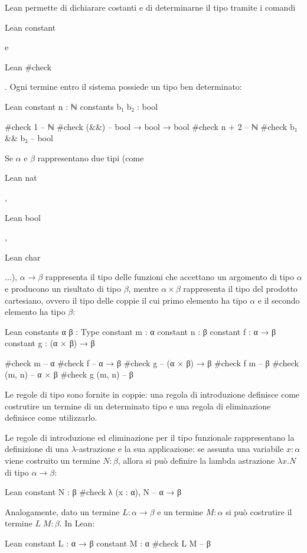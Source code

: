 Lean permette di dichiarare costanti e di determinarne il tipo tramite i comandi  \begin{mintinline}{Lean} constant \end{mintinline} e \begin{mintinline}{Lean} #check \end{mintinline}. Ogni termine entro il sistema possiede un tipo ben determinato:
\begin{code}{Lean}
constant n : ℕ
constants b₁ b₂ : bool

#check 1 -- ℕ
#check (&&) -- bool → bool → bool
#check n + 2 -- ℕ
#check b₁ && b₂ -- bool
\end{code}

Se $\alpha$ e $\beta$ rappresentano due tipi (come \begin{mintinline}
{Lean} nat \end{mintinline}, \begin{mintinline}
{Lean} bool \end{mintinline}, \begin{mintinline}
{Lean} char \end{mintinline} ...), $\alpha \rightarrow \beta$ rappresenta il tipo delle funzioni che accettano un argomento di tipo $\alpha$ e producono un risultato di tipo $\beta$, mentre $\alpha \times \beta$ rappresenta il tipo del prodotto cartesiano, ovvero il tipo delle coppie il cui primo elemento ha tipo $\alpha$ e il secondo elemento ha tipo $\beta$:
\begin{code}{Lean}
constants α β : Type
constant m : α
constant n : β
constant f : α → β
constant g : (α × β) → β

#check m -- α
#check f -- α → β
#check g -- (α × β) → β
#check f m -- β
#check (m, n) -- α × β
#check g (m, n) -- β
\end{code}
Le regole di tipo sono fornite in coppie: una regola di introduzione definisce come costrutire un termine di un determinato tipo e una regola di eliminazione definisce come utilizzarlo.

Le regole di introduzione ed eliminazione per il tipo funzionale rappresentano la definizione di una $\lambda$-astrazione e la sua applicazione: se assunta una variabile $x : \alpha$ viene costruito un termine $N : \beta$, allora si può definire la lambda astrazione $\lambda x.N$ di tipo $\alpha \rightarrow \beta$:
\begin{code}{Lean}
constant N : β
#check λ (x : α), N -- α → β
\end{code}
Analogamente, dato un termine $L : \alpha \rightarrow \beta$ e un termine $M : \alpha$ si può costrutire il termine $L\; M : \beta$. In Lean:
\begin{code}{Lean}
constant L : α → β
constant M : α
#check L M -- β
\end{code}

